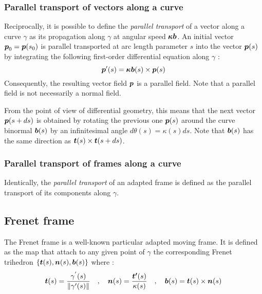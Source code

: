 \subsubsection{Parallel transport of vectors along a curve}
Reciprocally, it is possible to define the \emph{parallel transport} of a vector along a curve $\gamma$ as its propagation along $\gamma$ at angular speed $\boldsymbol{\kappa b}$. An initial vector $\boldsymbol{p}_0 = \boldsymbol{p}(s_0)$ is parallel transported at arc length parameter $s$ into the vector $\boldsymbol{p}(s)$ by integrating the following first-order differential equation along $\gamma$ :
\begin{equation}
	\boldsymbol{p}'(s) = \boldsymbol{\kappa b}(s) \times  \boldsymbol{p}(s)
\end{equation}
Consequently, the resulting vector field $\boldsymbol{p}$ is a parallel field. Note that a parallel field is not necessarily a normal field. 

From the point of view of differential geometry, this means that the next vector $\boldsymbol{p}(s+ds)$ is obtained by rotating the previous one $\boldsymbol{p}(s)$ around the curve binormal $\boldsymbol{b}(s)$ by an infinitesimal angle $d\theta(s) = \kappa(s) ds$. Note that $\boldsymbol{b}(s)$ has the same direction as $\boldsymbol{t}(s) \times \boldsymbol{t}(s+ds)$.

\subsubsection{Parallel transport of frames along a curve}
Identically, the \emph{parallel transport} of an adapted frame is defined as the parallel transport of its components along $\gamma$.

%

\subsection{Frenet frame}

The Frenet frame is a well-known particular adapted moving frame. It is defined as the map that attach to any given point of $\gamma$ the corresponding Frenet trihedron $\{\boldsymbol{t}(s),\boldsymbol{n}(s),\boldsymbol{b}(s)\}$ where :
\begin{gather}
\boldsymbol{t}(s) = \frac{\gamma^{'}(s)}{\lVert\gamma'(s)\rVert}
\quad,\quad
\boldsymbol{n}(s) = \frac{\boldsymbol{t'}(s)}{\kappa(s)}
\quad,\quad
\boldsymbol{b}(s)= \boldsymbol{t}(s)\times\boldsymbol{n}(s)
\end{gather}

